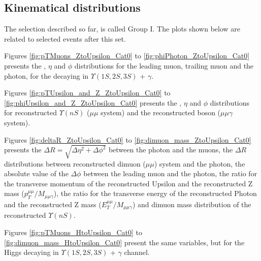 \subsection{Kinematical distributions}
\label{sec:kin_plots_group_1}

The selection described so far, is called Group I. The plots shown below are related to selected events after this set. 

Figures \ref{fig:pTMuons_ZtoUpsilon_Cat0} to \ref{fig:phiPhoton_ZtoUpsilon_Cat0} presents the \PT, $\eta$ and $\phi$ distributions for the leading muon, trailing muon and the photon, for the \Z decaying in $\Upsilon(1S,2S,3S)$ + $\gamma$. 

Figures \ref{fig:pTUpsilon_and_Z_ZtoUpsilon_Cat0} to \ref{fig:phiUpsilon_and_Z_ZtoUpsilon_Cat0} presents the \PT, $\eta$ and $\phi$ distributions for reconstructed $\Upsilon(nS)$ ($\mu\mu$ system) and the reconstructed boson ($\mu\mu\gamma$ system).

Figures \ref{fig:deltaR_ZtoUpsilon_Cat0} to \ref{fig:dimuon_mass_ZtoUpsilon_Cat0} presents the $\Delta R = \sqrt{\Delta\eta^2 + \Delta\phi^2}$ between the photon and the muons, the $\Delta R$ distributions between reconstructed dimuon ($\mu\mu$) system and the photon, the absolute value of the $\Delta \phi$ between the leading muon and the photon, the ratio for the transverse momentum of the reconstructed Upsilon and the reconstructed Z mass ($p_{T}^{\mu\mu}/M_{\mu\mu\gamma}$), the ratio for the transverse energy of the reconstructed Photon and the reconstructed Z mass ($E_{T}^{\mu\mu}/M_{\mu\mu\gamma}$) and dimuon mass distribution of the reconstructed $\Upsilon(nS)$.

Figures \ref{fig:pTMuons_HtoUpsilon_Cat0} to \ref{fig:dimuon_mass_HtoUpsilon_Cat0} present the same variables, but for the Higgs decaying in $\Upsilon(1S,2S,3S)$ + $\gamma$ channel.

